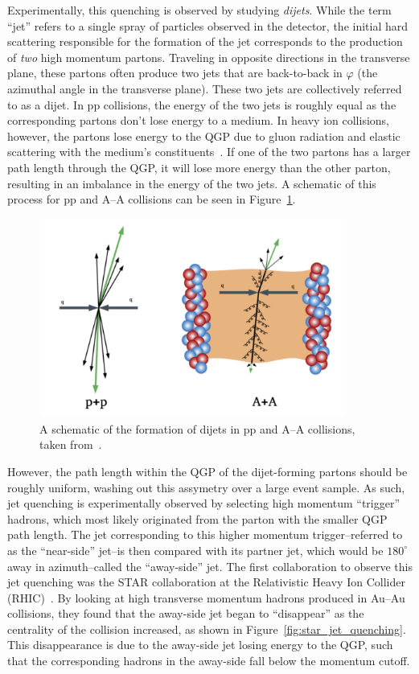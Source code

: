 Experimentally, this quenching is observed by studying \textit{dijets}. While the term ``jet'' refers to a single spray of particles observed in the detector, the initial hard scattering responsible for the formation of the jet corresponds to the production of \textit{two} high momentum partons. Traveling in opposite directions in the transverse plane, these partons often produce two jets that are back-to-back in $\varphi$ (the azimuthal angle in the transverse plane). These two jets are collectively referred to as a dijet. In pp collisions, the energy of the two jets is roughly equal as the corresponding partons don't lose energy to a medium. In heavy ion collisions, however, the partons lose energy to the QGP due to gluon radiation and elastic scattering with the medium's constituents~\cite{JetQuenchingReview}. If one of the two partons has a larger path length through the QGP, it will lose more energy than the other parton, resulting in an imbalance in the energy of the two jets. A schematic of this process for pp and A--A collisions can be seen in Figure~\ref{fig:dijet_schematic}. 

\begin{figure}[ht]
    \centering
    \includegraphics[width=0.9\textwidth]{figures/introduction/dijet_schematic.png}
    \caption{A schematic of the formation of dijets in pp and A--A collisions, taken from~\cite{DijetSchematic}.}
    \label{fig:dijet_schematic}
\end{figure}

However, the path length within the QGP of the dijet-forming partons should be roughly uniform, washing out this assymetry over a large event sample. As such, jet quenching is experimentally observed by selecting high momentum ``trigger'' hadrons, which most likely originated from the parton with the smaller QGP path length. The jet corresponding to this higher momentum trigger--referred to as the ``near-side'' jet--is then compared with its partner jet, which would be $180^\circ$ away in azimuth--called the ``away-side'' jet. The first collaboration to observe this jet quenching was the STAR collaboration at the Relativistic Heavy Ion Collider (RHIC)~\cite{STARJetQuenching}. By looking at high transverse momentum hadrons produced in Au--Au collisions, they found that the away-side jet began to ``disappear'' as the centrality of the collision increased, as shown in Figure~\ref{fig:star_jet_quenching}. This disappearance is due to the away-side jet losing energy to the QGP, such that the corresponding hadrons in the away-side fall below the momentum cutoff.

